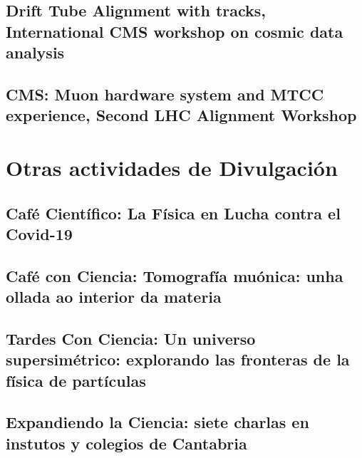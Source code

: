 \documentclass[a4paper, 11pt, twoside, openright]{report}
\begin{document}
\subsection{Drift Tube Alignment with tracks, International CMS workshop on cosmic data analysis}


\subsection{CMS: Muon hardware system and MTCC experience, Second LHC Alignment Workshop}



\section{Otras actividades de Divulgación}

\subsection{Café Científico: La Física en Lucha contra el Covid-19}


\subsection{Café con Ciencia: Tomografía muónica: unha ollada ao interior da materia}


\subsection{Tardes Con Ciencia: Un universo supersimétrico: explorando las fronteras de la física de partículas}


\subsection{Expandiendo la Ciencia: siete charlas en instutos y colegios de Cantabria}

\end{document}
